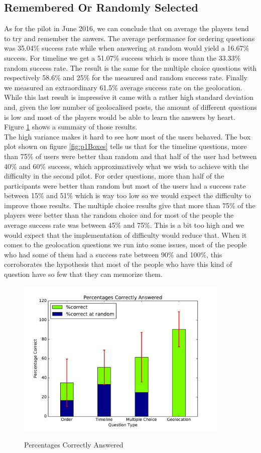 \subsection{Remembered Or Randomly Selected}
As for the pilot in June 2016, we can conclude that on average the players tend to try and remember the anwers. The average performance for ordering questions was 35.04\% success rate while when answering at random would yield a 16.67\% success. For timeline we get a 51.07\% success which is more than the 33.33\% random success rate. The result is the same for the multiple choice questions with respectively 58.6\% and 25\% for the measured and random success rate. Finally we measured an extraordinary 61.5\% average success rate on the geolocation. While this last result is impressive it came with a rather high standard deviation and, given the low number of geolocalised posts, the amount of different questions is low and most of the players would be able to learn the answers by heart. Figure \ref{fig:p1Correct} shows a summary of those results.\\
The high variance makes it hard to see how most of the users behaved. The box plot shown on figure \ref{fig:p1Boxes} tells us that for the timeline questions, more than 75\% of users were better than random and that half of the user had between 40\% and 60\% success, which approximatively what we wish to achieve with the difficulty in the second pilot. For order questions, more than half of the participants were better than random but most of the users had a success rate between 15\% and 51\% which is way too low so we would expect the difficulty to improve those results. The multiple choice results give that more than 75\% of the players were better than the random choice and for most of the people the average success rate was between 45\% and 75\%. This is a bit too high and we would expect that the implementation of difficulty would reduce that. When it comes to the geolocation questions we run into some issues, most of the people who had some of them had a success rate between 90\% and 100\%, this corroborates the hypothesis that most of the people who have this kind of question have so few that they can memorize them.
\begin{figure}
\centering
{\includegraphics[width=4in]{images/pilot_1_correct.pdf}}
\caption{Percentages Correctly Answered}
\label{fig:p1Correct}
\end{figure}
